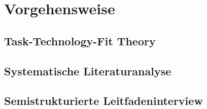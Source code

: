 \clearpage
\chapter{Vorgehensweise}
\section{Task-Technology-Fit Theory}
\newpage
\section{Systematische Literaturanalyse}
\newpage
\section{Semistrukturierte Leitfadeninterview}
\newpage